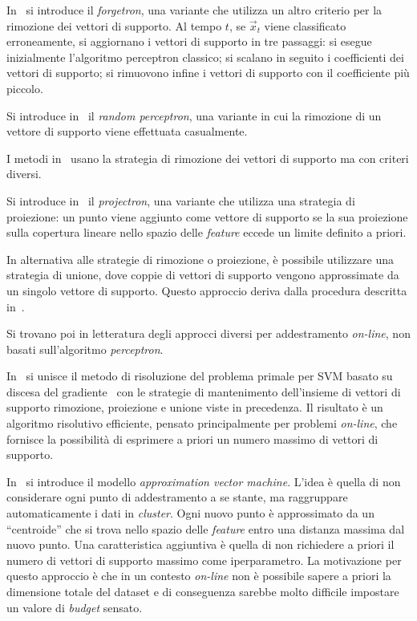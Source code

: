 In~\cite{2005_forgetron} si introduce il \emph{forgetron}, una variante che utilizza un altro criterio per la rimozione dei vettori di supporto. 
Al tempo $t$, se $\Vec{x}_t$ viene classificato erroneamente, si aggiornano i vettori di supporto in tre passaggi: si esegue inizialmente l'algoritmo perceptron classico; si scalano in seguito i coefficienti dei vettori di supporto; si rimuovono infine i vettori di supporto con il coefficiente più piccolo.

Si introduce in~\cite{2007_random_removal} il \emph{random perceptron}, una variante in cui la rimozione di un vettore di supporto viene effettuata casualmente.

I metodi in~\cite{2003_online_classification_on_a_budget,2005_forgetron,2007_random_removal} usano la strategia di rimozione dei vettori di supporto ma con criteri diversi.

Si introduce in~\cite{2008_projectron} il \emph{projectron}, una variante che utilizza una strategia di proiezione: un punto viene aggiunto come vettore di supporto se la sua proiezione sulla copertura lineare nello spazio delle \emph{feature} eccede un limite definito a priori. 
%

In alternativa alle strategie di rimozione o proiezione, è possibile utilizzare una strategia di unione, dove coppie di vettori di supporto vengono approssimate da un singolo vettore di supporto.
Questo approccio deriva dalla procedura descritta in~\cite{2005_merging_strategy}.

Si trovano poi in letteratura degli approcci diversi per addestramento \emph{on-line}, non basati sull'algoritmo \emph{perceptron}.

In~\cite{2012_bsgd} si unisce il metodo di risoluzione del problema primale per SVM basato su discesa del gradiente~\cite{2007_chappelle_training_svm_primal, pegasos_solver} con le strategie di mantenimento dell'insieme di vettori di supporto rimozione, proiezione e unione viste in precedenza. 
Il risultato è un algoritmo risolutivo efficiente, pensato principalmente per problemi \emph{on-line}, che fornisce la possibilità di esprimere a priori un numero massimo di vettori di supporto.

In~\cite{2017_approximation_vm} si introduce il modello \emph{approximation vector machine}. 
L'idea è quella di non considerare ogni punto di addestramento a se stante, ma raggruppare automaticamente  i dati in \emph{cluster}. 
Ogni nuovo punto è approssimato da un ``centroide'' che si trova nello spazio delle \emph{feature} entro una distanza massima dal nuovo punto. 
Una caratteristica aggiuntiva è quella di non richiedere a priori il numero di vettori di supporto massimo come iperparametro.
La motivazione per questo approccio è che in un contesto \emph{on-line} non è possibile sapere a priori la dimensione totale del dataset e di conseguenza sarebbe molto difficile impostare un valore di \emph{budget} sensato. 


